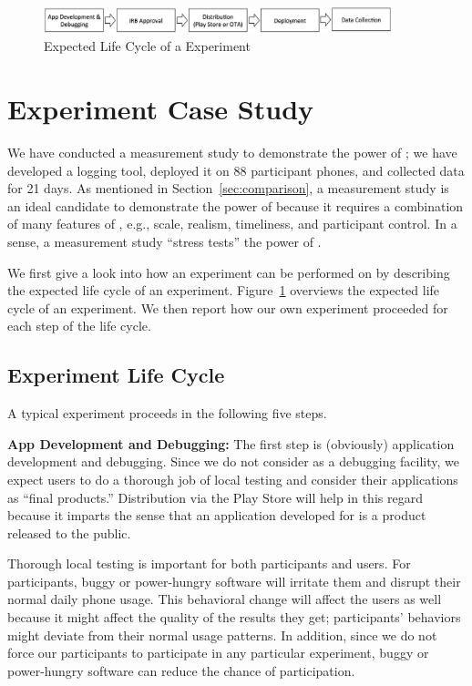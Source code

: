 \begin{figure}[t]
\centering
\includegraphics[width=0.9\textwidth]{./figures/static/experiment-life-cycle.pdf}
\caption{Expected Life Cycle of a \PhoneLab{} Experiment}
\label{fig:experiment-life-cycle}
\end{figure}

\section{Experiment Case Study}
\label{sec-experiment}

We have conducted a measurement study to demonstrate the power of \PhoneLab{};
we have developed a logging tool, deployed it on 88 participant phones, and
collected data for 21 days. 
As mentioned in Section~\ref{sec:comparison}, a measurement study is an ideal
candidate to demonstrate the power of \PhoneLab{} because it requires a
combination of many features of \PhoneLab{}, e.g., scale, realism, timeliness,
and participant control. In a sense, a measurement study ``stress tests'' the
power of \PhoneLab{}.

We first give a look into how an experiment can be performed on \PhoneLab{} by
describing the expected life cycle of an experiment.
Figure~\ref{fig:experiment-life-cycle} overviews the expected life cycle of an
experiment. We then report how our own experiment proceeded for each step of the
life cycle.

\subsection{Experiment Life Cycle}

A typical \PhoneLab{} experiment proceeds in the following five steps.

{\bf App Development and Debugging:} The first step is (obviously) application
development and debugging. Since we do not consider \PhoneLab{} as a debugging
facility, we expect \PhoneLab{} users to do a thorough job of local testing and
consider their applications as ``final products.'' Distribution via the Play
Store will help in this regard because it imparts the sense that an application
developed for \PhoneLab{} is a product released to the public.

Thorough local testing is important for both \PhoneLab{} participants and users.
For participants, buggy or power-hungry software will irritate them and disrupt
their normal daily phone usage. This behavioral change will affect the users as
well because it might affect the quality of the results they get; participants'
behaviors might deviate from their normal usage patterns. In addition, since we
do not force our participants to participate in any particular experiment, buggy
or power-hungry software can reduce the chance of participation.

